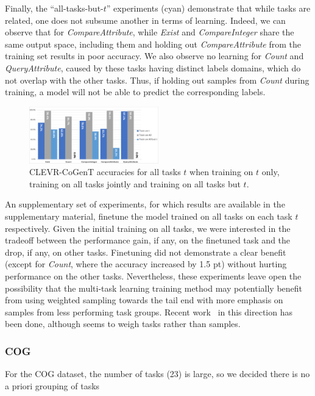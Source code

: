 Finally, the ``all-tasks-but-$t$'' experiments (cyan) demonstrate that while tasks are related, one does not subsume another in terms of learning. Indeed, we can observe that for \textit{CompareAttribute}, while \textit{Exist} and \textit{CompareInteger} share the same output space, including them and holding out \textit{CompareAttribute} from the training set results in poor accuracy. We also observe no learning for \textit{Count} and \textit{QueryAttribute}, caused by these tasks having distinct labels domains, which do not overlap with the other tasks. Thus, if holding out samples from \textit{Count} during training, a model will not be able to predict the corresponding labels.

\begin{figure}[!t]
	\centering
	\includegraphics[width=0.5\textwidth]{img/results/CoGenT_results.pdf}
	\caption{CLEVR-CoGenT accuracies for all tasks $t$ when training on $t$ only, training on all tasks jointly and training on all tasks but $t$.} %
	\label{fig:CoGenT-results}
\end{figure}

An supplementary set of experiments, for which results are available in the supplementary material,
finetune the model trained on all tasks on each task $t$ respectively. Given the initial training on all tasks, we were interested in the tradeoff between the performance gain, if any, on the finetuned task and the drop, if any, on other tasks. Finetuning did not demonstrate a clear benefit (except for \textit{Count}, where the accuracy increased by 1.5 pt) without hurting performance on the other tasks. Nevertheless, these experiments leave open the possibility that the multi-task learning training method may potentially benefit from using weighted sampling towards the tail end with more emphasis on samples from less performing task groups. Recent work~\cite{guo2018dynamic, kendall2018multi} in this direction has been done, although seems to weigh tasks rather than samples.

\subsubsection{COG}
\label{sec:reasoning-cog}
For the COG dataset, the number of tasks (23) is large, so we decided  there is no a priori grouping of tasks 


